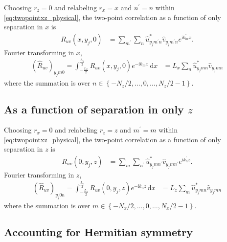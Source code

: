 \documentclass[letterpaper,11pt,nointlimits,reqno]{amsart}
\newcommand{\ii}{\ensuremath{\mathrm{i}}}
\begin{document}
Choosing $r_z = 0$ and relabeling $r_x = x$ and $n^\prime = n$ within
\eqref{eq:twopointxz_physical}, the two-point correlation as a
function of only separation in $x$ is
\begin{align}
R_{uv} \left( x, y_j, 0 \right)
  &= \sum_{m^\prime}
     \sum_{n}
     \hat{u}^\ast_{y_j m^\prime n}
     \hat{v}_{y_j m^\prime n}
     e^{\ii k_m^\prime x}.
    \label{eq:twopointx_physical}
\end{align}
Fourier transforming in $x$,
\begin{align}
\left(\hat{R}_{uv}\right)_{y_j m 0}
   =
    \int_{-\frac{L_x}{2}}^{\frac{L_x}{2}}
    R_{uv} \left( x, y_j, 0 \right)
    e^{-\ii k_m x}
    \,\mathrm{d}x
  &=
    L_x
    \sum_{n}
    \hat{u}^\ast_{y_j m n}
    \hat{v}_{y_j m n}
    \label{eq:twopointx_wave}
\end{align}
where the summation is over $n \in \left\{-N_z/2, \dots, 0, \dots,
N_z/2-1\right\}$.

\subsection{As a function of separation in only $z$}

Choosing $r_x = 0$ and relabeling $r_z = z$ and $m^\prime = m$ within
\eqref{eq:twopointxz_physical}, the two-point correlation as a
function of only separation in $z$ is
\begin{align}
R_{uv} \left( 0, y_j, z \right)
  &= \sum_{m}
     \sum_{n^\prime}
     \hat{u}^\ast_{y_j m n^\prime}
     \hat{v}_{y_j m n^\prime}
     e^{\ii k_n^\prime z}.
    \label{eq:twopointz_physical}
\end{align}
Fourier transforming in $z$,
\begin{align}
\left(\hat{R}_{uv}\right)_{y_j 0 n}
   =
    \int_{-\frac{L_z}{2}}^{\frac{L_z}{2}}
    R_{uv} \left( 0, y_j, z \right)
    e^{-\ii k_n z}
    \,\mathrm{d}x
  &=
    L_z
    \sum_{m}
    \hat{u}^\ast_{y_j m n}
    \hat{v}_{y_j m n}
    \label{eq:twopointz_wave}
\end{align}
where the summation is over $m \in \left\{-N_x/2, \dots, 0, \dots,
N_x/2-1\right\}$.

\subsection{Accounting for Hermitian symmetry}
\end{document}
